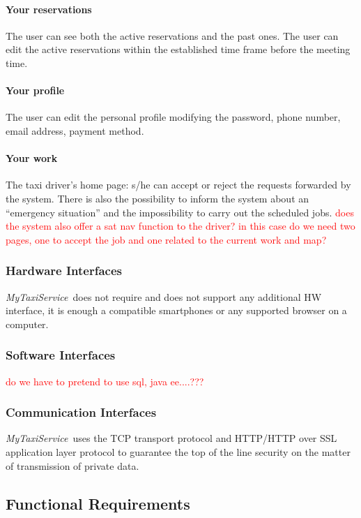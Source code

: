 \documentclass[a4paper,11pt]{report} %
\newcommand{\mts}{\mbox{\normalfont\itshape MyTaxiService\ }}
\begin{document}
	\paragraph{Your reservations} The user can see both the active reservations and the past ones. The user can edit the active reservations within the established time frame before the meeting time.
	
	\paragraph{Your profile} The user can edit the personal profile modifying the password, phone number, email address, payment method.
	
	\paragraph{Your work} The taxi driver's home page: s/he can accept or reject the requests forwarded by the system. There is also the possibility to inform the system about an ``emergency situation'' and the impossibility to carry out the scheduled jobs. \textcolor{red}{does the system also offer a sat nav function to the driver? in this case do we need two pages, one to accept the job and one related to the current work and map?}
	
	\subsubsection{Hardware Interfaces} \mts does not require and does not support any additional HW interface, it is enough a compatible smartphones or any supported browser on a computer.
	
	\subsubsection{Software Interfaces} \textcolor{red}{do we have to pretend to use sql, java ee....???}
	
	\subsubsection{Communication Interfaces} \mts uses the TCP transport protocol and HTTP/HTTP over SSL application layer protocol to guarantee the top of the line security on the matter of transmission of private data.
	
	\subsection{Functional Requirements}
	
\end{document}
